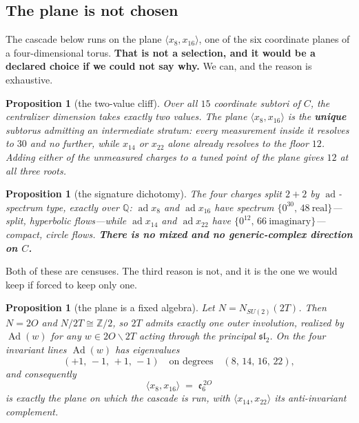 \documentclass[11pt,reqno]{amsart}
\theoremstyle{plain}
\newtheorem{proposition}[theorem]{Proposition}
\theoremstyle{definition}
\theoremstyle{remark}
\newcommand{\Q}{\mathbb{Q}}
\newcommand{\Z}{\mathbb{Z}}
\newcommand{\sll}{\mathfrak{sl}}
\newcommand{\ee}{\mathfrak{e}}
\newcommand{\ad}{\operatorname{ad}}
\newcommand{\Ad}{\operatorname{Ad}}
\begin{document}
\subsection{The plane is not chosen}\label{sec:planeforced}

The cascade below runs on the plane $\langle x_8,x_{16}\rangle$, one of the six coordinate
planes of a four-dimensional torus. \textbf{That is not a selection, and it would be a
declared choice if we could not say why.} We can, and the reason is exhaustive.

\begin{proposition}[the two-value cliff]\label{prop:cliff}
Over all $15$ coordinate subtori of $C$, the centralizer dimension takes exactly two
values. The plane $\langle x_8,x_{16}\rangle$ is the \textbf{unique} subtorus admitting an
intermediate stratum: every measurement inside it resolves to $30$ and no further, while
$x_{14}$ or $x_{22}$ \emph{alone} already resolves to the floor $12$. Adding either of the
unmeasured charges to a tuned point of the plane gives $12$ at all three roots.
\end{proposition}

\begin{proposition}[the signature dichotomy]\label{prop:dichotomy}
The four charges split $2+2$ by $\ad$-spectrum type, exactly over $\Q$: $\ad x_8$ and
$\ad x_{16}$ have spectrum $\{0^{30},\,48\ \text{real}\}$---split, hyperbolic flows---while
$\ad x_{14}$ and $\ad x_{22}$ have $\{0^{12},\,66\ \text{imaginary}\}$---compact, circle
flows. \textbf{There is no mixed and no generic-complex direction on $C$.}
\end{proposition}

Both of these are censuses. The third reason is not, and it is the one we would keep if
forced to keep only one.

\begin{proposition}[the plane is a fixed algebra]\label{prop:twoO}
Let $N=N_{SU(2)}(2T)$. Then $N=2O$ and $N/2T\cong\Z/2$, so $2T$ admits exactly one outer
involution, realized by $\Ad(w)$ for any $w\in 2O\smallsetminus 2T$ acting through the
principal $\sll_2$. On the four invariant lines $\Ad(w)$ has eigenvalues
\[
   (+1,\,-1,\,+1,\,-1)\quad\text{on degrees}\quad (8,\,14,\,16,\,22),
\]
and consequently
\[
   \boxed{\ \langle x_8,x_{16}\rangle\;=\;\ee_6^{\,2O}\ }
\]
is exactly the plane on which the cascade is run, with $\langle x_{14},x_{22}\rangle$ its
anti-invariant complement.
\end{proposition}
\end{document}
